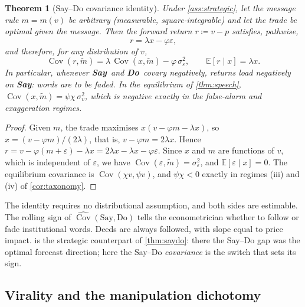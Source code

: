 \documentclass[11pt,a4paper]{article}
\theoremstyle{plain}
\newtheorem{theorem}{Theorem}[section]
\theoremstyle{definition}
\theoremstyle{remark}
\newcommand{\E}{\mathbb{E}}
\DeclareMathOperator{\Cov}{Cov}
\newcommand{\SAY}{\textcolor{say}{\textbf{Say}}}
\newcommand{\DO}{\textcolor{do}{\textbf{Do}}}
\begin{document}
\begin{theorem}[Say--Do covariance identity]\label{thm:identity}
Under \cref{ass:strategic}, let the message rule $m=m(v)$ be \emph{arbitrary} (measurable, square-integrable) and let the trade be optimal given the message. Then the forward return $r\coloneqq v-p$ satisfies, pathwise,
\[
  r=\lambda x-\varphi\varepsilon,
\]
and therefore, for any distribution of $v$,
\[
  \Cov(r,\tilde m)=\lambda\,\Cov(x,\tilde m)-\varphi\,\sigma_\varepsilon^2,\qquad \E[r\mid x]=\lambda x .
\]
In particular, whenever \SAY\ and \DO\ covary negatively, returns load negatively on \SAY: words are to be faded. In the equilibrium of \cref{thm:speech}, $\Cov(x,\tilde m)=\psi\chi\,\sigma_v^2$, which is negative exactly in the false-alarm and exaggeration regimes.
\end{theorem}
\begin{proof}
Given $m$, the trade maximises $x(v-\varphi m-\lambda x)$, so $x=(v-\varphi m)/(2\lambda)$, that is, $v-\varphi m=2\lambda x$. Hence $r=v-\varphi(m+\varepsilon)-\lambda x=2\lambda x-\lambda x-\varphi\varepsilon$. Since $x$ and $m$ are functions of $v$, which is independent of $\varepsilon$, we have $\Cov(\varepsilon,\tilde m)=\sigma_\varepsilon^2$, and $\E[\varepsilon\mid x]=0$. The equilibrium covariance is $\Cov(\chi v,\psi v)$, and $\psi\chi<0$ exactly in regimes (iii) and (iv) of \cref{cor:taxonomy}.
\end{proof}

\begin{keyidea}
The identity requires no distributional assumption, and both sides are estimable. The rolling sign of $\widehat{\Cov}(\text{Say},\text{Do})$ tells the econometrician whether to follow or fade institutional words. Deeds are always followed, with slope equal to price impact.  is the strategic counterpart of \cref{thm:saydo}: there the Say--Do gap was the optimal forecast direction; here the Say--Do \emph{covariance} is the switch that sets its sign.
\end{keyidea}

\subsection{Virality and the manipulation dichotomy}
\end{document}
